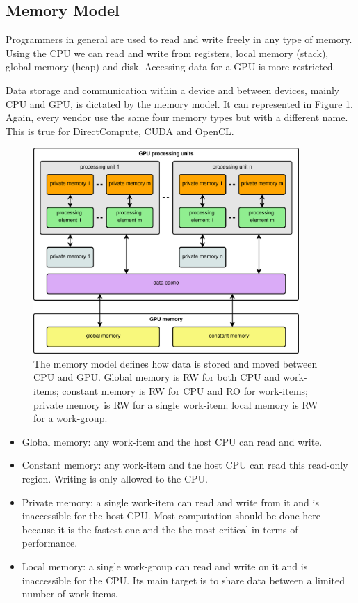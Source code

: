 \documentclass{article}
\begin{document}
\subsection{Memory Model}

Programmers in general are used to read and write freely in any type of memory. Using the CPU we can read and write from registers, local memory (stack), global memory (heap) and disk. Accessing data for a GPU is more restricted.

Data storage and communication within a device and between devices, mainly CPU and GPU, is dictated by the memory model. It can represented in Figure \ref{figure:memory}. Again, every vendor use the same four memory types but with a different name. This is true for DirectCompute, CUDA and OpenCL.

\begin{figure}[!ht]
\centering
\includegraphics[width=0.9\textwidth]{memory.eps}
\caption{The memory model defines how data is stored and moved between CPU and GPU. Global memory is RW for both CPU and work-items; constant memory is RW for CPU and RO for work-items; private memory is RW for a single work-item; local memory is RW for a work-group.}
\label{figure:memory}
\end{figure}

\begin{itemize}
\item Global memory: any work-item and the host CPU can read and write.
\item Constant memory: any work-item and the host CPU can read this read-only region. Writing is only allowed to the CPU.
\item Private memory: a single work-item can read and write from it and is inaccessible for the host CPU. Most computation should be done here because it is the fastest one and the the most critical in terms of performance.
\item Local memory: a single work-group can read and write on it and is inaccessible for the CPU. Its main target is to share data between a limited number of work-items.
\end{itemize}
\end{document}
